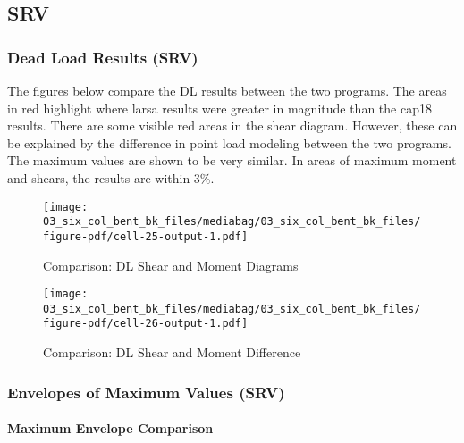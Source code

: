 \documentclass[
  letterpaper,
  DIV=11,
  numbers=noendperiod]{scrartcl}
\let\oldparagraph\paragraph
\renewcommand{\paragraph}[1]{\oldparagraph{#1}\mbox{}}
\begin{document}
\newpage{}

\subsection{SRV}\label{srv-2}

\subsubsection{Dead Load Results (SRV)}\label{dead-load-results-srv-2}

The figures below compare the DL results between the two programs. The
areas in red highlight where larsa results were greater in magnitude
than the cap18 results. There are some visible red areas in the shear
diagram. However, these can be explained by the difference in point load
modeling between the two programs. The maximum values are shown to be
very similar. In areas of maximum moment and shears, the results are
within 3\%.

\begin{figure}[H]

{\centering \texttt{[image: 03\_six\_col\_bent\_bk\_files/mediabag/03\_six\_col\_bent\_bk\_files/figure-pdf/cell-25-output-1.pdf]}

}

\caption{Comparison: DL Shear and Moment Diagrams}

\end{figure}%

\begin{figure}[H]

{\centering \texttt{[image: 03\_six\_col\_bent\_bk\_files/mediabag/03\_six\_col\_bent\_bk\_files/figure-pdf/cell-26-output-1.pdf]}

}

\caption{Comparison: DL Shear and Moment Difference}

\end{figure}%

\newpage{}

\subsubsection{Envelopes of Maximum Values
(SRV)}\label{envelopes-of-maximum-values-srv-2}

\paragraph{Maximum Envelope
Comparison}\label{maximum-envelope-comparison}
\end{document}

